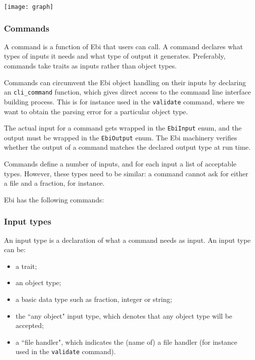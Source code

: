 \documentclass{article}
\def\ebiCommand#1{\texttt{#1}}
\begin{document}
        
        	\texttt{[image: graph]}
        \restoregeometry
    
        \subsubsection{Commands}
            A command is a function of Ebi that users can call.
            A command declares what types of inputs it needs and what type of output it generates. 
            Preferably, commands take traits as inputs rather than object types.
    
            Commands can circumvent the Ebi object handling on their inputs by declaring an \texttt{cli\_command} function, which gives direct access to the command line interface building process.
            This is for instance used in the \ebiCommand{validate} command, where we want to obtain the parsing error for a particular object type.
    
            The actual input for a command gets wrapped in the \texttt{EbiInput} enum, and the output must be wrapped in the \texttt{EbiOutput} enum.
            The Ebi machinery verifies whether the output of a command matches the declared output type at run time.
            
            Commands define a number of inputs, and for each input a list of acceptable types.
            However, these types need to be similar: a command cannot ask for either a file and a fraction, for instance.
    
            Ebi has the following commands:
            \ebicommandlist
    
        \subsubsection{Input types}
            An input type is a declaration of what a command needs as input.
            An input type can be:
            \begin{itemize}
                \item a trait;
                \item an object type;
                \item a basic data type such as fraction, integer or string;
                \item the ``any object" input type, which denotes that any object type will be accepted;
                \item a ``file handler", which indicates the (name of) a file handler (for instance used in the \ebiCommand{validate} command).
            \end{itemize}
    
\end{document}
